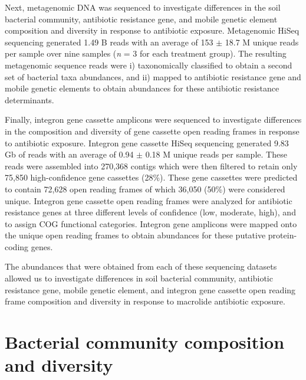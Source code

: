 Next, metagenomic DNA was sequenced to investigate differences in the soil bacterial community, antibiotic resistance gene, and mobile genetic element composition and diversity in response to antibiotic exposure.
Metagenomic HiSeq sequencing generated 1.49 B reads with an average of 153 $\pm$ 18.7 M unique reads per sample over nine samples (\textit{n} = 3 for each treatment group).
The resulting metagenomic sequence reads were i) taxonomically classified to obtain a second set of bacterial taxa abundances, and ii) mapped to antibiotic resistance gene and mobile genetic elements to obtain abundances for these antibiotic resistance determinants.

Finally, integron gene cassette amplicons were sequenced to investigate differences in the composition and diversity of gene cassette open reading frames in response to antibiotic exposure.
Integron gene cassette HiSeq sequencing generated 9.83 Gb of reads with an average of 0.94 $\pm$ 0.18 M unique reads per sample.
These reads were assembled into 270,368 contigs which were then filtered to retain only 75,850 high-confidence gene cassettes (28\%).
These gene cassettes were predicted to contain 72,628 open reading frames of which 36,050 (50\%) were considered unique.
Integron gene cassette open reading frames were analyzed for antibiotic resistance genes at three different levels of confidence (low, moderate, high), and to assign COG functional categories.
Integron gene amplicons were mapped onto the unique open reading frames to obtain abundances for these putative protein-coding genes.

The abundances that were obtained from each of these sequencing datasets allowed us to investigate differences in soil bacterial community, antibiotic resistance gene, mobile genetic element, and integron gene cassette open reading frame composition and diversity in response to macrolide antibiotic exposure.

\section{Bacterial community composition and diversity}

